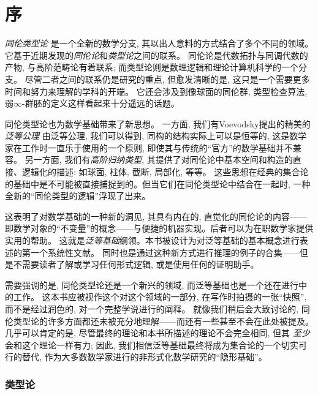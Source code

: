 \chapter*{序}
\setcounter{page}{1}


\emph{同伦类型论} 是一个全新的数学分支, 其以出人意料的方式结合了多个不同的领域。它基于近期发现的\emph{同伦论}和\emph{类型论}之间的联系。
同伦论是代数拓扑与同调代数的产物, 与高阶范畴论有着联系; 而类型论则是数理逻辑和理论计算机科学的一个分支。
尽管二者之间的联系仍是研究的重点, 但愈发清晰的是, 这只是一个需要更多时间和努力来理解的学科的开端。
它还会涉及到像球面的同伦群, 类型检查算法, 弱$\infty$-群胚的定义这样看起来十分遥远的话题。

同伦类型论也为数学基础带来了新思想。
%
一方面, 我们有Voevodsky提出的精美的\emph{泛等公理}
%
由泛等公理, 我们可以得到, 同构的结构实际上可以是恒等的, 这是数学家在工作时一直乐于使用的一个原则, 即使其与传统的``官方''的数学基础并不兼容。
另一方面, 我们有\emph{高阶归纳类型}, 其提供了对同伦论中基本空间和构造的直接、逻辑化的描述: 如球面, 柱体, 截断, 局部化, 等等。
这些思想在经典的集合论的基础中是不可能被直接捕捉到的。但当它们在同伦类型论中结合在一起时, 一种全新的``同伦类型的逻辑''浮现了出来。
%

这表明了对数学基础的一种新的洞见, 其具有内在的, 直觉化的同伦论的内容——
即数学对象的``不变量''的概念——与便捷的机器实现。后者可以为在职数学家提供实用的帮助。
这就是\emph{泛等基础}纲领。本书被设计为对泛等基础的基本概念进行表述的第一个系统性文献。
同时也是通过这种新方式进行推理的例子的合集——但是不需要读者了解或学习任何形式逻辑, 或是使用任何的证明助手。

\OPTwidow

需要强调的是, 同伦类型论还是一个新兴的领域, 而泛等基础也是一个还在进行中的工作。
这本书应被视作这个对这个领域的一部分, 在写作时拍摄的一张``快照'', 而不是经过润色的, 对一个完整学说进行的阐释。
就像我们稍后会大致讨论的, 同伦类型论的许多方面都还未被充分地理解——而还有一些甚至不会在此处被提及。
几乎可以肯定的是, 尽管最终的理论和本书所描述的理论不会完全相同, 但其 \emph{至少} 会和这个理论一样有力; 因此, 
我们相信泛等基础最终将成为集合论的一个切实可行的替代, 作为大多数数学家进行的非形式化数学研究的``隐形基础''。

\subsection*{类型论}

